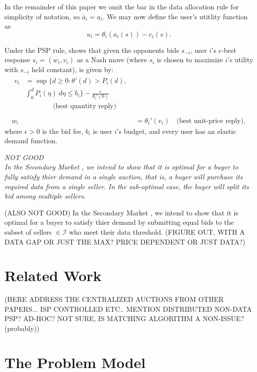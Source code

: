 \documentclass[12pt]{article}
\theoremstyle{definition}
\newcommand{\mcI}{\mathcal{I}}
\begin{document}
\begin{multicols}{2}
In the remainder of this paper we omit the bar in the data allocation rule for
simplicity of notation, so $\bar{a}_i = a_i$. We may now define the user's utitlity function as
\begin{equation}\label{utility}
    u_i = \theta_i(a_i(s)) - c_i(s).
\end{equation}

Under the PSP rule, \cite{lazar} shows that given the opponents bids $s_{-i}$,
user $i$'s $\epsilon$-best response $s_i = (w_i, v_i)$ as a Nash move
(where $s_i$ is chosen to maximize $i$'s utility with $s_{-i}$ held constant), is
given by:
\begin{align}
\begin{split}
    v_i &= \sup\bigg\lbrace d \ge 0 : \theta '(d) > P_i(d), \\ 
&\displaystyle\int_0^d P_i(\eta) \ d\eta \le b_i\bigg\rbrace -
\frac{\epsilon}{\theta_i'(0)} \\
&\qquad\qquad \text{(best quantity reply)} \\
\end{split}\\
    w_i &= \theta_i'(v_i) \quad \text{(best unit-price reply)},
\end{align}
where $\epsilon > 0$ is the bid fee, $b_i$ is user $i$'s budget, and every user
has an elastic demand function.

\emph{NOT GOOD\\
In the Secondary Market \cite{zheng}, we intend to show that it is optimal for a
buyer to fully satisfy thier demand in a single auction, that is, a buyer
will purchase its required data from a single seller. In the sub-optimal case,
the buyer will split its bid among multiple sellers. }

(ALSO NOT GOOD)
In the Secondary Market \cite{zheng}, we intend to show that it is optimal for a
buyer to satisfy thier demand by submitting equal bids to the subset of sellers
$\in \mcI$ who
meet their data threshold. (FIGURE OUT, WITH A
DATA GAP OR JUST THE MAX? PRICE DEPENDENT OR JUST DATA?)

\section{Related Work}
(HERE ADDRESS THE CENTRALIZED AUCTIONS FROM OTHER PAPERS... ISP CONTROLLED
ETC.. MENTION DISTRIBUTED NON-DATA PSP? AD-HOC? NOT SURE, IS MATCHING ALGORITHM
A NON-ISSUE? (probably)) 

\section{The Problem Model}

\end{multicols}
\end{document}

